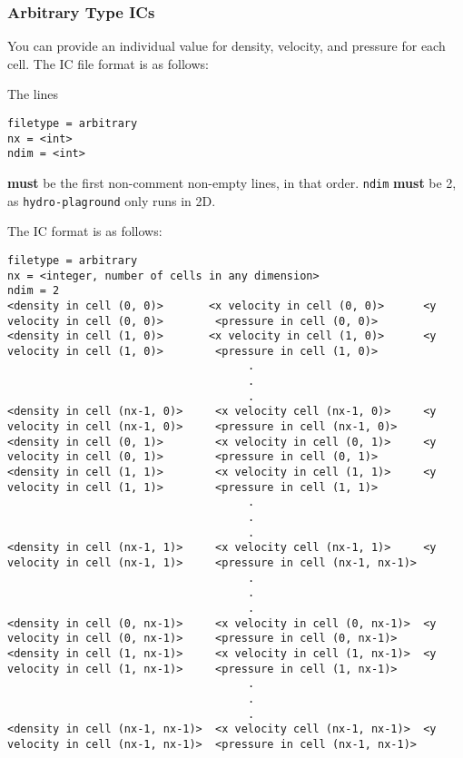 \subsubsection{Arbitrary Type ICs}\label{chap:arbitrary-ic}




You can provide an individual value for density, velocity, and pressure for each
cell. The IC file format is as follows:

The lines

\begin{lstlisting}
filetype = arbitrary
nx = <int>
ndim = <int>
\end{lstlisting}

\textbf{must} be the first non-comment non-empty lines, in that order.
\texttt{ndim} \textbf{must} be 2, as \texttt{hydro-plaground} only runs
in 2D.

The IC format is as follows:

\begin{lstlisting}
filetype = arbitrary
nx = <integer, number of cells in any dimension>
ndim = 2
<density in cell (0, 0)>       <x velocity in cell (0, 0)>      <y velocity in cell (0, 0)>        <pressure in cell (0, 0)>
<density in cell (1, 0)>       <x velocity in cell (1, 0)>      <y velocity in cell (1, 0)>        <pressure in cell (1, 0)>
                                     .
                                     .
                                     .
<density in cell (nx-1, 0)>     <x velocity cell (nx-1, 0)>     <y velocity in cell (nx-1, 0)>     <pressure in cell (nx-1, 0)>
<density in cell (0, 1)>        <x velocity in cell (0, 1)>     <y velocity in cell (0, 1)>        <pressure in cell (0, 1)>
<density in cell (1, 1)>        <x velocity in cell (1, 1)>     <y velocity in cell (1, 1)>        <pressure in cell (1, 1)>
                                     .
                                     .
                                     .
<density in cell (nx-1, 1)>     <x velocity cell (nx-1, 1)>     <y velocity in cell (nx-1, 1)>     <pressure in cell (nx-1, nx-1)>
                                     .
                                     .
                                     .
<density in cell (0, nx-1)>     <x velocity in cell (0, nx-1)>  <y velocity in cell (0, nx-1)>     <pressure in cell (0, nx-1)>
<density in cell (1, nx-1)>     <x velocity in cell (1, nx-1)>  <y velocity in cell (1, nx-1)>     <pressure in cell (1, nx-1)>
                                     .
                                     .
                                     .
<density in cell (nx-1, nx-1)>  <x velocity cell (nx-1, nx-1)>  <y velocity in cell (nx-1, nx-1)>  <pressure in cell (nx-1, nx-1)>
\end{lstlisting}

